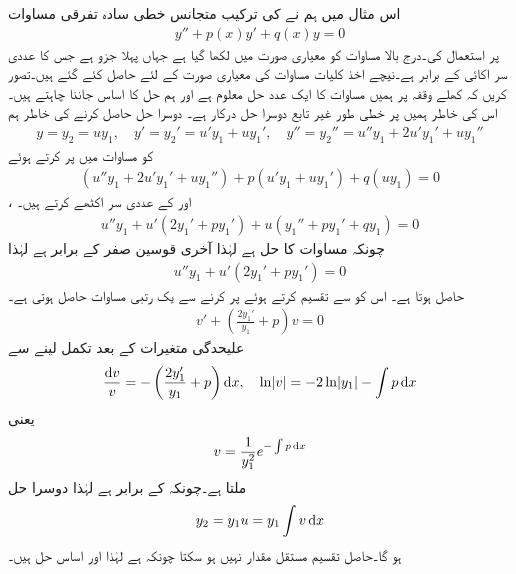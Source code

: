 اس مثال میں ہم نے  کی ترکیب متجانس خطی سادہ تفرقی مساوات 
\begin{align}\label{مساوات_سادہ_دو_درجی_متجانس_تخفیف_الف}
y''+p(x)y'+q(x)y=0
\end{align}
پر استعمال کی۔درج بالا مساوات کو معیاری صورت میں لکھا گیا ہے جہاں پہلا جزو  ہے جس کا عددی سر اکائی کے برابر ہے۔نیچے اخذ کلیات مساوات کی معیاری صورت کے لئے حاصل کئے گئے ہیں۔تصور کریں کہ کھلے وقفہ  پر ہمیں مساوات  کا ایک عدد حل  معلوم ہے اور ہم حل کا اساس جاننا چاہتے ہیں۔ اس کی خاطر ہمیں  پر خطی طور غیر تابع دوسرا حل  درکار ہے۔  دوسرا حل حاصل کرنے کی خاطر ہم
\begin{align*}
y=y_2=uy_1, \quad y'=y_2'=u'y_1+uy_1',\quad y''=y_2''=u''y_1+2u'y_1'+uy_1''
\end{align*}
کو مساوات  میں پر کرتے ہوئے 
\begin{align*}
(u''y_1+2u'y_1'+uy_1'')+p(u'y_1+uy_1')+q(uy_1)=0
\end{align*}
،  اور  کے عددی سر اکٹھے کرتے ہیں۔
\begin{align*}
u''y_1+u'(2y_1'+py_1')+u(y_1''+py_1'+qy_1)=0
\end{align*}
چونکہ  مساوات  کا حل ہے لہٰذا آخری قوسین صفر کے برابر ہے لہٰذا
\begin{align*}
u''y_1+u'(2y_1'+py_1')=0
\end{align*}
حاصل ہوتا ہے۔ اس کو   سے تقسیم کرتے ہوئے  پر کرنے سے  یک رتبی مساوات حاصل ہوتی ہے۔
 \begin{align*}
v'+\left(\frac{2y_1'}{y_1}+p\right)v=0
\end{align*}
علیحدگی متغیرات کے بعد تکمل لینے سے
\begin{align*}
\frac{\dif v}{v}=-\left(\frac{2y_1'}{y_1}+p\right) \dif x, \quad \ln \abs{v}=-2\ln \abs{y_1}-\int p \dif x
\end{align*}
یعنی
\begin{align}\label{مساوات_دوسری_دوسرے_حل_کا_جزو_ضربی}
v=\frac{1}{y_1^2}e^{-\int p\dif x}
\end{align}
ملتا ہے۔چونکہ  کے برابر ہے لہٰذا دوسرا حل
\begin{align}
y_2=y_1u=y_1 \int v \dif x
\end{align}
ہو گا۔حاصل تقسیم  مستقل مقدار نہیں ہو سکتا چونکہ  ہے لہٰذا  اور  اساس حل ہیں۔

